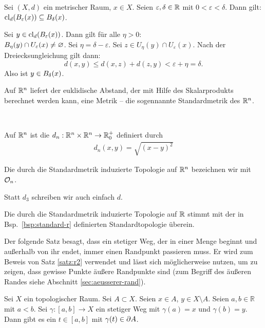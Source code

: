     \begin{satz}\label{satz:ball}
    Sei $(X,d)$ ein metrischer Raum, $x \in X$. Seien $\varepsilon, \delta \in \mathbb{R}$ mit $0 < \varepsilon< \delta$. Dann gilt: $\text{cl}_d(B_\varepsilon(x)) \subseteq B_\delta(x)$.
    \end{satz}
    \begin{bew}
    Sei $y \in \text{cl}_d(B_\varepsilon(x))$. Dann gilt für alle $\eta > 0$:\\ $B_\eta(y) \cap U_\varepsilon(x) \neq \varnothing$. Sei $\eta = \delta - \varepsilon$. Sei $z \in U_\eta(y) \cap U_\varepsilon(x)$. Nach der Dreiecksungleichung gilt dann:
    $$d(x,y) \leq d(x,z) + d(z,y) < \varepsilon + \eta = \delta.$$
    Also ist $y \in B_\delta(x)$.
    \end{bew}


    Auf
    $\mathbb{R}^n$ liefert der euklidische Abstand, der mit Hilfe des Skalarprodukts berechnet werden kann, eine Metrik -- die sogennannte Standardmetrik des $\mathbb{R}^n$.
    \begin{dfn}\label{def:standardmetrik}\ \vspace{8pt}

        \noindent
        Auf $\mathbb{R}^n$ ist die  $d_n : \mathbb{R}^n \times \mathbb{R}^n \rightarrow \mathbb{R}_0^+$ definiert durch
        \begin{align*}
            d_n(x,y) = \sqrt{(x-y)^2}
        \end{align*}
        
        \noindent
        Die durch die Standardmetrik induzierte Topologie auf $\mathbb{R}^n$ bezeichnen wir mit $\mathcal{O}_n$.
        
    \end{dfn}

    \begin{konv}\label{konv:d3}
        Statt $d_3$ schreiben wir auch einfach $d$.	
    \end{konv}
    
    \begin{bem}
        Die durch die Standardmetrik induzierte Topologie auf $\mathbb{R}$ stimmt mit der in Bsp.~\ref{bsp:standard-r} definierten Standardtopologie überein.
    \end{bem}
%
%
    Der folgende Satz besagt, dass ein stetiger Weg, der in einer Menge beginnt und außerhalb von ihr endet, immer einen Randpunkt passieren muss. Er wird zum Beweis von Satz \ref{satz:r2} verwendet und lässt sich möglicherweise nutzen, um zu zeigen, dass gewisse Punkte äußere Randpunkte sind (zum Begriff des äußeren Randes siehe Abschnitt \ref{sec:aeusserer-rand}).
    \begin{satz}\label{satz:weg} %
        Sei $X$ ein topologischer Raum. Sei $A \subset X$. Seien $x \in A$, $y \in X \setminus A$. Seien $a,b \in \mathbb{R}$ mit $a < b$. Sei $\gamma : [a,b] \to X$ ein stetiger Weg mit $\gamma(a) = x$ und $\gamma(b) = y$. Dann gibt es ein $t \in [a,b]$ mit $\gamma(t) \in \partial A$.
    \end{satz}
    
